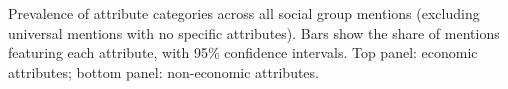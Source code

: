 Prevalence of attribute categories across all social group mentions (excluding universal mentions with no specific attributes). Bars show the share of mentions featuring each attribute, with 95\% confidence intervals. Top panel: economic attributes; bottom panel: non-economic attributes.